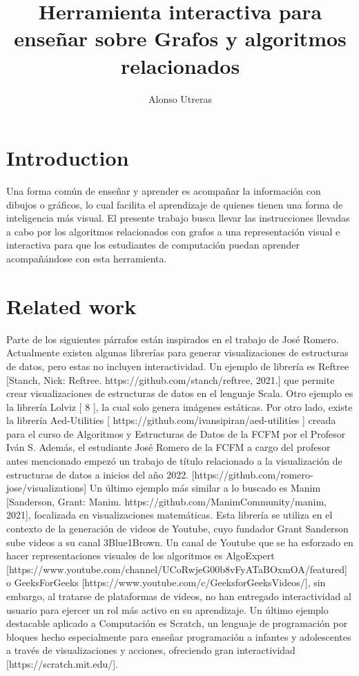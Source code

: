 \documentclass[submission]{eptcs}
\title{Herramienta interactiva para enseñar sobre Grafos y algoritmos relacionados}
\author{ Alonso Utreras
\institute{Department of Computer Science\\
University of Chile\\
Santiago, Chile}
\email{alonso.utreras@ug.uchile.cl}
\email{autreras@dcc.uchile.cl}
}
\begin{document}
\maketitle

\section{Introduction}
 
Una forma común de enseñar y aprender es acompañar la información con dibujos o gráficos, lo cual
facilita el aprendizaje de quienes tienen una forma de inteligencia más visual. El presente trabajo
busca llevar las instrucciones llevadas a cabo por los algoritmos relacionados con grafos a una
representación visual e interactiva para que los estudiantes de computación puedan aprender acompañándose
con esta herramienta.

\section{Related work}

Parte de los siguientes párrafos están inspirados en el trabajo de José Romero.
Actualmente existen algunas librerías para generar visualizaciones de estructuras de
datos, pero estas no incluyen interactividad. Un ejemplo de librería es Reftree [Stanch, Nick: Reftree.
https://github.com/stanch/reftree, 2021.] que permite crear visualizaciones de estructuras de datos en
el lenguaje Scala.
Otro ejemplo es la librería Lolviz [ 8 ], la cual solo genera imágenes estáticas.
Por otro lado, existe la librería Aed-Utilities [ https://github.com/ivansipiran/aed-utilities ] creada para el curso de Algoritmos
y Estructuras de Datos de la FCFM por el Profesor Iván S.
Además, el estudiante José Romero de la FCFM a cargo del profesor antes mencionado
empezó un trabajo de título relacionado a la visualización de estructuras de datos
a inicios del año 2022. [https://github.com/romero-jose/visualizations]
Un último ejemplo más similar a lo buscado es Manim [Sanderson, Grant: Manim. https://github.com/ManimCommunity/manim, 2021], focalizada en visualizaciones 
matemáticas. Esta librería se utiliza en el contexto de la generación de videos de Youtube,
cuyo fundador Grant Sanderson sube videos a su canal 3Blue1Brown.
Un canal de Youtube que se ha esforzado en hacer representaciones visuales de los algoritmos 
es AlgoExpert 
[https://www.youtube.com/channel/UCoRwjeG00b8vFyATaBOxmOA/featured] o
GeeksForGeeks 
[https://www.youtube.com/c/GeeksforGeeksVideos/], sin embargo,
al tratarse de plataformas de videos, no han entregado interactividad al usuario para
ejercer un rol más activo en su aprendizaje.
Un último ejemplo destacable aplicado a Computación es Scratch, un lenguaje de programación por bloques
hecho especialmente para enseñar programación a infantes y adolescentes a través de visualizaciones y acciones,
ofreciendo gran interactividad [https://scratch.mit.edu/].
\end{document}
